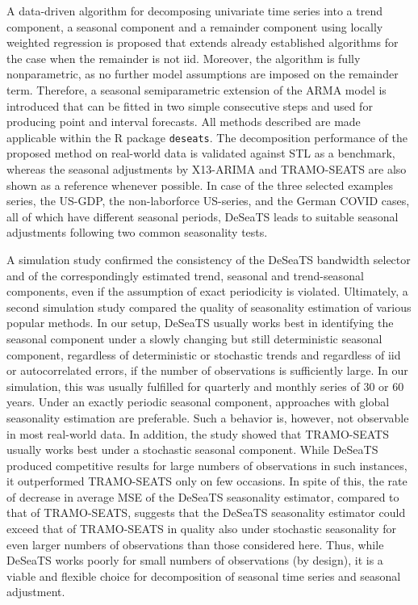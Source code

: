 A data-driven algorithm for decomposing univariate time series into a trend component, a seasonal component and a remainder component using locally weighted regression is proposed that extends already established algorithms for the case when the remainder is not iid. Moreover, the algorithm is fully nonparametric, as no further model assumptions are imposed on the remainder term. Therefore, a seasonal semiparametric extension of the ARMA model is introduced that can be fitted in two simple consecutive steps and used for producing point and interval forecasts. All methods described are made applicable within the R package \texttt{deseats}. The decomposition performance of the proposed method on real-world data is validated against STL as a benchmark, whereas the seasonal adjustments by X13-ARIMA and TRAMO-SEATS are also shown as a reference whenever possible. In case of the three selected examples series, the US-GDP, the non-laborforce US-series, and the German COVID cases, all of which have different seasonal periods, DeSeaTS leads to suitable seasonal adjustments following two common seasonality tests.

A simulation study confirmed the consistency of the DeSeaTS bandwidth selector and of the correspondingly estimated trend, seasonal and trend-seasonal components, even if the assumption of exact periodicity is violated. Ultimately, a second simulation study compared the quality of seasonality estimation of various popular methods. In our setup, DeSeaTS usually works best in identifying the seasonal component under a slowly changing but still deterministic seasonal component, regardless of deterministic or stochastic trends and regardless of iid or autocorrelated errors, if the number of observations is sufficiently large. In our simulation, this was usually fulfilled for quarterly and monthly series of 30 or 60 years. Under an exactly periodic seasonal component, approaches with global seasonality estimation are preferable. Such a behavior is, however, not observable in most real-world data. In addition, the study showed that TRAMO-SEATS usually works best under a stochastic seasonal component. While DeSeaTS produced competitive results for large numbers of observations in such instances, it outperformed TRAMO-SEATS only on few occasions. In spite of this, the rate of decrease in average MSE of the DeSeaTS seasonality estimator, compared to that of TRAMO-SEATS, suggests that the DeSeaTS seasonality estimator could exceed that of TRAMO-SEATS in quality also under stochastic seasonality for even larger numbers of observations than those considered here. Thus, while DeSeaTS works poorly for small numbers of observations (by design), it is a viable and flexible choice for decomposition of seasonal time series and seasonal adjustment.

